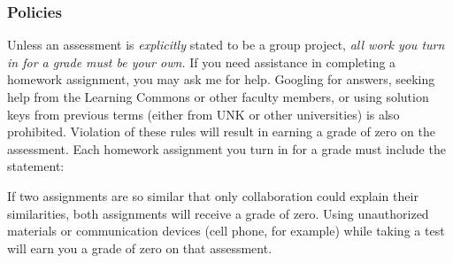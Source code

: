\documentclass[12pt]{article}
\newcounter{ex}\setcounter{ex}{0}
\begin{document}
\subsubsection* {Policies}

Unless an assessment is \emph{explicitly} stated to be a group project,  \emph{all work you turn in for a grade must be your own.}  If you need assistance in completing a homework assignment, you may ask me for help. Googling for answers, seeking help from the Learning Commons or other faculty members,  or using solution keys from previous terms (either from UNK or other universities) is also prohibited.  Violation of these rules will result in earning a grade of zero on the assessment. Each homework assignment you turn in for a grade must include the statement:

\begin{quote}
\end{quote}
 If two assignments are so similar that only collaboration could explain their similarities, both assignments will receive a grade of zero.  Using unauthorized materials or communication devices (cell phone, for
example) while taking a test will earn you a grade of zero on that assessment.  

 
\end{document}
